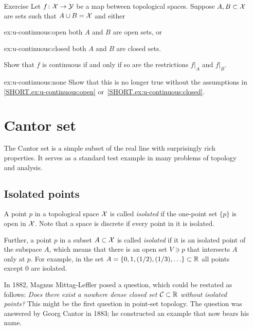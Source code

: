 \begin{thm}[!]{Exercise}\label{ex:u-continuous}
Let $f\colon\mathcal{X}\to \mathcal{Y}$ be a map between topological spaces.
Suppose $A,B\subset\mathcal{X}$ are sets such that $A\cup B=\mathcal{X}$ and either
\begin{subthm}{ex:u-continuous:open}
both $A$ and $B$ are open sets, or
\end{subthm}
\begin{subthm}{ex:u-continuous:closed}
both $A$ and $B$ are closed sets.
\end{subthm}
Show that $f$ is continuous if and only if so are the restrictions $f|_A$ and $f|_B$.

\begin{subthm}{ex:u-continuous:none}
Show that this is no longer true without the assumptions in \ref{SHORT.ex:u-continuous:open} or~\ref{SHORT.ex:u-continuous:closed}.
\end{subthm}

\end{thm}

\chapter{Cantor set}\label{chap:Cantor set}

The Cantor set is a simple subset of the real line with surprisingly
rich properties. It serves as a standard test example in many problems
of topology and analysis.

\section{Isolated points}

A point $p$ in a topological space $\mathcal{X}$ is called \emph{isolated} if the one-point set $\{p\}$ is open in $\mathcal{X}$.
Note that a space is discrete if every point in it is isolated.

Further, a point $p$ in a subset $A\subset \mathcal{X}$ is called \emph{isolated} if it is an isolated point of the subspace $A$,
which means that there is an open set $V\ni p$ that intersects $A$ only at $p$.
For example, in the set $A=\{0,1,(1/2),(1/3),\ldots\}\subset\mathbb{R}$ all points except $0$ are isolated.

In 1882, Magnus Mittag-Leffler posed a question, which could be restated as follows:
\textit{Does there exist a nowhere dense closed set $\mathcal{C}\subset\mathbb{R}$ without isolated points?}
This might be the first question in point-set topology.
The question was answered by Georg Cantor in 1883; he constructed an example that now bears his name.

